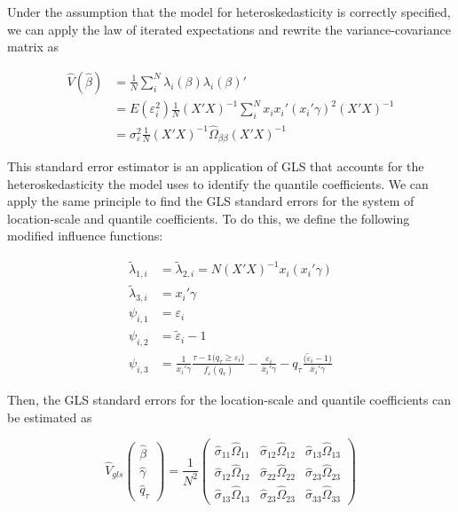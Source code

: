 \documentclass[
  authoryear,
  review,
  1p]{elsarticle}
\begin{document}
Under the assumption that the model for heteroskedasticity is correctly
specified, we can apply the law of iterated expectations and rewrite the
variance-covariance matrix as

\[\begin{aligned}
\hat V(\hat \beta) &= \frac{1}{N} \sum_i^N \lambda_{i}(\beta) \lambda_{i}(\beta)' \\
&= E(\varepsilon_i^2) \frac{1}{N}  (X'X)^{-1}  \sum_i^N x_i x_i' ( x_i'\gamma)^2 (X'X)^{-1} \\
&= \sigma^2_{\varepsilon} \frac{1}{N}  (X'X)^{-1}  \hat\Omega_{\beta\beta} (X'X)^{-1}  
\end{aligned}
\]

This standard error estimator is an application of GLS that accounts for
the heteroskedasticity the model uses to identify the quantile
coefficients. We can apply the same principle to find the GLS standard
errors for the system of location-scale and quantile coefficients. To do
this, we define the following modified influence functions:

\[\begin{aligned}
\tilde \lambda_{1,i}&=\tilde \lambda_{2,i}=N (X'X)^{-1}  x_i ( x_i'\gamma) \\  
\tilde \lambda_{3,i}&=x_i' \gamma  \\
 \psi_{i,1} &= \varepsilon_i \\
 \psi_{i,2} &= \tilde \varepsilon_i -1 \\
 \psi_{i,3} &= \frac{1}{ x_i' \gamma }\frac{\tau-\mathbb{1}\big( q_\tau  \geq \varepsilon_i  \big) }{ f_{\varepsilon}(q_\tau)} - \frac{\varepsilon_i }{\bar x_i'\gamma} 
-  q_\tau \frac{(\tilde \varepsilon_i -1\big)}{\bar x_i'\gamma}
\end{aligned}
\]

Then, the GLS standard errors for the location-scale and quantile
coefficients can be estimated as

\[\hat{V}_{gls}
  \begin{pmatrix}
  \hat\beta \\
  \hat\gamma \\
  \hat q_\tau
  \end{pmatrix}
 = \frac{1}{N^2} 
 \begin{pmatrix}
 \hat\sigma_{11} \hat\Omega_{11} & \hat\sigma_{12} \hat\Omega_{12} & \hat\sigma_{13} \hat\Omega_{13} \\
 \hat\sigma_{12} \hat\Omega_{12} & \hat\sigma_{22} \hat\Omega_{22} & \hat\sigma_{23} \hat\Omega_{23} \\
 \hat\sigma_{13} \hat\Omega_{13} & \hat\sigma_{23} \hat\Omega_{23} & \hat\sigma_{33} \hat\Omega_{33}
  \end{pmatrix}
\]
\end{document}
